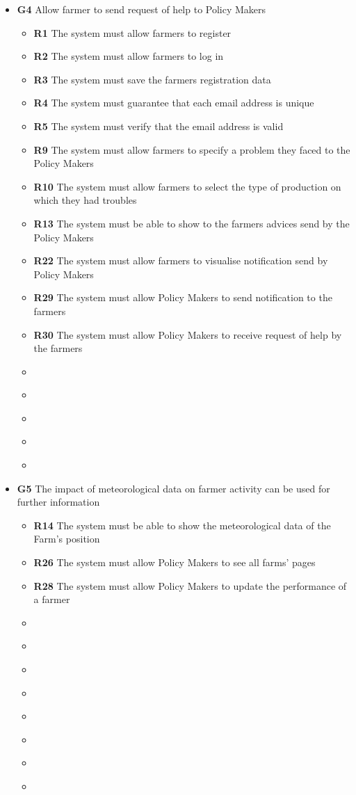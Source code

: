 \begin{itemize}
\item \textbf{G4} Allow farmer to send request of help to Policy Makers
    \begin{itemize}
    \renewcommand\labelitemi{--}
    \item \textbf{R1} The system must allow farmers to register
    \item \textbf{R2} The system must allow farmers to log in
    \item \textbf{R3} The system must save the farmers registration data
    \item \textbf{R4} The system must guarantee that each email address is unique
    \item \textbf{R5} The system must verify that the email address is valid
    \item \textbf{R9} The system must allow farmers to specify a problem they faced to the Policy Makers
    \item \textbf{R10} The system must allow farmers to select the type of production on which they had troubles
    \item \textbf{R13} The system must be able to show to the farmers advices send by the Policy Makers
    \item \textbf{R22} The system must allow farmers to visualise notification send by Policy Makers
    \item \textbf{R29} The system must allow Policy Makers to send notification to the farmers
    \item \textbf{R30} The system must allow Policy Makers to receive request of help by the farmers
    \item \textbf{}
    \item \textbf{}
    \item \textbf{}
    \item \textbf{}
    \item \textbf{}
    \end{itemize} 

\item \textbf{G5} The impact of meteorological data on farmer activity can be used for further information
    \begin{itemize}
    \renewcommand\labelitemi{--}
    \item \textbf{R14} The system must be able to show the meteorological data of the Farm’s position
    \item \textbf{R26} The system must allow Policy Makers to see all farms’ pages
    \item \textbf{R28} The system must allow Policy Makers to update the performance of a farmer
    \item \textbf{}
    \item \textbf{}
    \item \textbf{}
    \item \textbf{}
    \item \textbf{}
    \item \textbf{}
    \item \textbf{}
    \item \textbf{}
    \end{itemize} 


\end{itemize}
